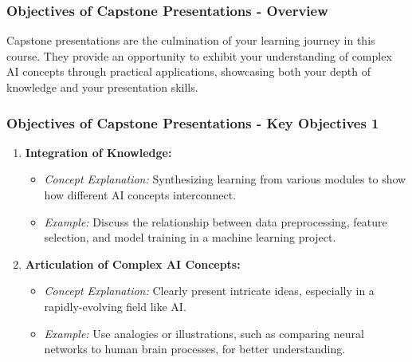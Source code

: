 \documentclass[aspectratio=169]{beamer}
\begin{document}
\begin{frame}[fragile]
    \frametitle{Objectives of Capstone Presentations - Overview}
    Capstone presentations are the culmination of your learning journey in this course. 
    They provide an opportunity to exhibit your understanding of complex AI concepts through practical applications, 
    showcasing both your depth of knowledge and your presentation skills.
\end{frame}

\begin{frame}[fragile]
    \frametitle{Objectives of Capstone Presentations - Key Objectives 1}
    \begin{enumerate}
        \item \textbf{Integration of Knowledge:}
        \begin{itemize}
            \item \textit{Concept Explanation:} Synthesizing learning from various modules to show how different AI concepts interconnect.
            \item \textit{Example:} Discuss the relationship between data preprocessing, feature selection, and model training in a machine learning project.
        \end{itemize}
        
        \item \textbf{Articulation of Complex AI Concepts:}
        \begin{itemize}
            \item \textit{Concept Explanation:} Clearly present intricate ideas, especially in a rapidly-evolving field like AI.
            \item \textit{Example:} Use analogies or illustrations, such as comparing neural networks to human brain processes, for better understanding.
        \end{itemize}
    \end{enumerate}
\end{frame}
\end{document}

